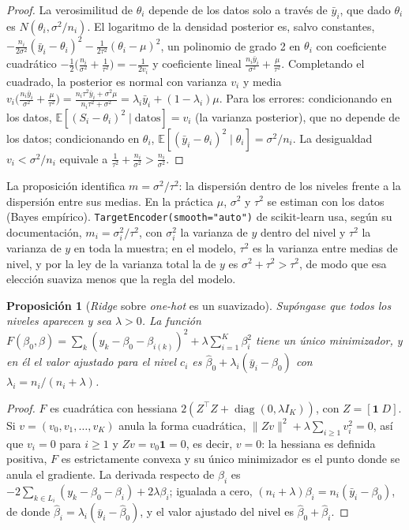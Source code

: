 \documentclass[11pt,a4paper]{article}
\theoremstyle{plain}
\newtheorem{proposicion}[teorema]{Proposición}
\theoremstyle{definition}
\theoremstyle{remark}
\newcommand{\E}{\mathbb{E}}
\newcommand{\1}{\mathbf{1}}
\begin{document}
\begin{proof}
La verosimilitud de $\theta_i$ depende de los datos solo a través de
$\bar y_i$, que dado $\theta_i$ es $N(\theta_i,\sigma^2/n_i)$. El
logaritmo de la densidad posterior es, salvo constantes,
$-\frac{n_i}{2\sigma^2}(\bar y_i-\theta_i)^2-\frac1{2\tau^2}(\theta_i-\mu)^2$,
un polinomio de grado 2 en $\theta_i$ con coeficiente cuadrático
$-\frac12\bigl(\frac{n_i}{\sigma^2}+\frac1{\tau^2}\bigr)=-\frac1{2v_i}$ y
coeficiente lineal $\frac{n_i\bar y_i}{\sigma^2}+\frac\mu{\tau^2}$.
Completando el cuadrado, la posterior es normal con varianza $v_i$ y media
$v_i\bigl(\frac{n_i\bar y_i}{\sigma^2}+\frac\mu{\tau^2}\bigr)
=\frac{n_i\tau^2\bar y_i+\sigma^2\mu}{n_i\tau^2+\sigma^2}=\lambda_i\bar
y_i+(1-\lambda_i)\mu$. Para los errores: condicionando en los datos,
$\E[(S_i-\theta_i)^2\mid\text{datos}]=v_i$ (la varianza posterior), que
no depende de los datos; condicionando en $\theta_i$,
$\E[(\bar y_i-\theta_i)^2\mid\theta_i]=\sigma^2/n_i$. La desigualdad
$v_i<\sigma^2/n_i$ equivale a $\frac1{\tau^2}+\frac{n_i}{\sigma^2}>\frac{n_i}{\sigma^2}$.
\end{proof}

La proposición identifica $m=\sigma^2/\tau^2$: la dispersión dentro de los
niveles frente a la dispersión entre sus medias. En la práctica $\mu$,
$\sigma^2$ y $\tau^2$ se estiman con los datos (Bayes empírico).
\texttt{TargetEncoder(smooth="auto")} de scikit-learn usa, según su
documentación, $m_i=\sigma_i^2/\tau^2$, con $\sigma_i^2$ la varianza de
$y$ dentro del nivel y $\tau^2$ la varianza de $y$ en toda la muestra; en
el modelo, $\tau^2$ es la varianza entre medias de nivel, y por la ley de
la varianza total la de $y$ es $\sigma^2+\tau^2>\tau^2$, de modo que esa
elección suaviza menos que la regla del modelo.

\begin{proposicion}[\emph{Ridge} sobre \emph{one-hot} es un suavizado]\label{prop:ridge-te}
Supóngase que todos los niveles aparecen y sea $\lambda>0$. La función
$F(\beta_0,\beta)=\sum_k(y_k-\beta_0-\beta_{i(k)})^2+\lambda\sum_{i=1}^K\beta_i^2$
tiene un único minimizador, y en él el valor ajustado para el nivel $c_i$
es $\hat\beta_0+\lambda_i(\bar y_i-\hat\beta_0)$ con
$\lambda_i=n_i/(n_i+\lambda)$.
\end{proposicion}

\begin{proof}
$F$ es cuadrática con hessiana $2(Z^\top Z+\operatorname{diag}(0,\lambda
I_K))$, con $Z=[\1\;D]$. Si $v=(v_0,v_1,\dots,v_K)$ anula la forma
cuadrática, $\|Zv\|^2+\lambda\sum_{i\ge1}v_i^2=0$, así que $v_i=0$ para
$i\ge1$ y $Zv=v_0\1=0$, es decir, $v=0$: la hessiana es definida positiva,
$F$ es estrictamente convexa y su único minimizador es el punto donde se
anula el gradiente. La derivada respecto de $\beta_i$ es
$-2\sum_{k\in L_i}(y_k-\beta_0-\beta_i)+2\lambda\beta_i$; igualada a cero,
$(n_i+\lambda)\beta_i=n_i(\bar y_i-\beta_0)$, de donde
$\hat\beta_i=\lambda_i(\bar y_i-\hat\beta_0)$, y el valor ajustado del
nivel es $\hat\beta_0+\hat\beta_i$.
\end{proof}
\end{document}
